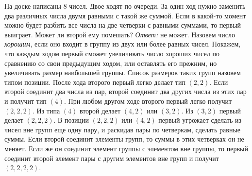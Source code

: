 \problem
На доске написаны $8$ чисел.
Двое ходят по очереди.
За один ход нужно заменить два различных числа двумя равными с такой же суммой.
Если в какой-то момент можно будет разбить все числа на две четверки с равными
суммами, то первый выиграет.
Может ли второй ему помешать?
\solution
\emph{Ответ:} не может.
Назовем число \emph{хорошим}, если оно входит в группу из двух или более равных
чисел.
Покажем, что каждым ходом первый сможет увеличивать число хороших чисел по
сравнению со свои предыдущим ходом, или оставлять его прежним, но увеличивать
размер наибольшей группы.
Список размеров таких групп назовем типом позиции.
После хода второго первый легко делает тип $(2, 2)$.
Если второй соединит два числа из пар, второй соединит два других числа из этих
пар и получит тип $(4)$.
При любом другом ходе второго первый легко получит $(2, 2, 2)$.
Из типа $(4)$ второй делает $(4, 2)$ или $(3, 2)$.
Из $(3, 2)$ первый делает $(2, 2, 2)$.
В позиции $(2, 2, 2)$ или $(4, 2)$ первый угрожает сделать из чисел вне групп
еще одну пару, и раскидав пары по четверкам, сделать равные суммы.
Если второй соединит элементы групп, то суммы в этих четверках он не меняет.
Если же он соединит элемент группы с элементом вне группы, то первый соединит
второй элемент пары с другим элементов вне групп и получит $(2, 2, 2, 2)$.
\endproblem

